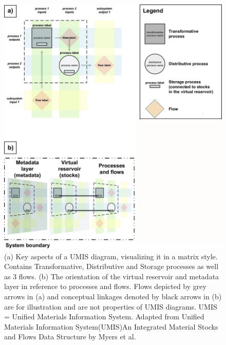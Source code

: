 \documentclass[ %
                    author={Tom Jager},
                supervisor={Dr. Daniel Schien},
                    degree={MEng},
                     title={A Bayesian Inference Engine for UMIS Structured Data},
                  subtitle={},
                      type={research},
                      year={2019} ]{dissertation}
\begin{document}
\begin{figure}[ht]
\centering
\includegraphics[width=\textwidth]{images/umis_aspects.jpg}
\caption{(a) Key aspects of a UMIS diagram, visualizing it in a matrix style. Contains Transformative, Distributive and Storage processes as well as 3 flows. (b) The orientation of the virtual reservoir and metadata layer in reference to processes and flows. Flows depicted by grey arrows in (a) and conceptual linkages denoted by black arrows in (b) are for illustration and are not properties of UMIS diagrams. UMIS = Unified Materials Information System. Adapted from Unified Materials Information System(UMIS)An Integrated Material Stocks and Flows Data Structure by Myers et al.}
\label{fig:umis_aspects}
\end{figure}
\end{document}
